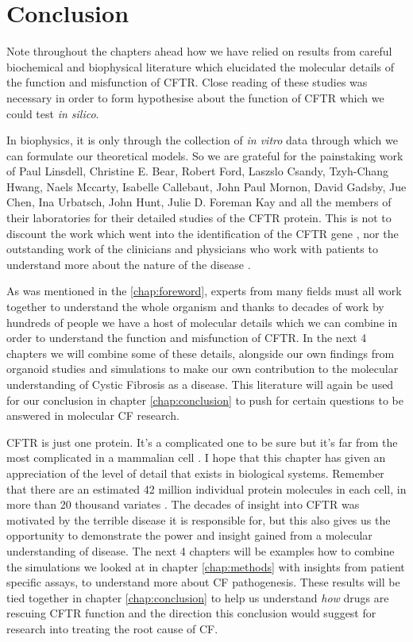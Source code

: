 \section{Conclusion}

Note throughout the chapters ahead how we have relied on results from careful biochemical and biophysical literature which elucidated the molecular details of the function and misfunction of CFTR. Close reading of these studies was necessary in order to form hypothesise about the function of CFTR which we could test \textit {in silico}. 

In biophysics, it is only through the collection of \textit{in vitro} data through which we can formulate our theoretical models. So we are grateful for the painstaking work of Paul Linsdell, Christine E. Bear, Robert Ford, Laszslo Csandy, Tzyh-Chang Hwang, Naels Mccarty, Isabelle Callebaut, John Paul Mornon, David Gadsby, Jue Chen, Ina Urbatsch, John Hunt, Julie D. Foreman Kay and all the members of their laboratories for their detailed studies of the CFTR protein. This is not to discount the work which went into the identification of the CFTR gene \cite{riordan1989}, nor the outstanding work of the clinicians and physicians who work with patients to understand more about the nature of the disease \cite{roberts1957}.  

As was mentioned in the \href{Foreword} {\ref{chap:foreword}}, experts from many fields must all work together to understand the whole organism and thanks to decades of work by hundreds of people we have a host of molecular details which we can combine in order to understand the function and misfunction of CFTR. In the next 4 chapters we will combine some of these details, alongside our own findings from organoid studies and simulations to make our own contribution to the molecular understanding of Cystic Fibrosis as a disease. This literature will again be used for our conclusion in chapter \ref{chap:conclusion} to push for certain questions to be answered in molecular CF research.

CFTR is just one protein. It's a complicated one to be sure but it's far from the most complicated in a mammalian cell \cite{saotome2018, zalk2015, chen2018a}. I hope that this chapter has given an appreciation of the level of detail that exists in biological systems. Remember that there are an estimated 42 million individual protein molecules in each cell, in more than 20 thousand variates \cite{ho2018, salzberg2018}. The decades of insight into CFTR was motivated by the terrible disease it is responsible for, but this also gives us the opportunity to demonstrate the power and insight gained from a molecular understanding of disease. The next 4 chapters will be examples how to combine the simulations we looked at in chapter \ref{chap:methods} with insights from patient specific assays, to understand more about CF pathogenesis. These results will be tied together in chapter \ref{chap:conclusion} to help us understand \textit{how} drugs are rescuing CFTR function and the direction this conclusion would suggest for research into treating the root cause of CF.

